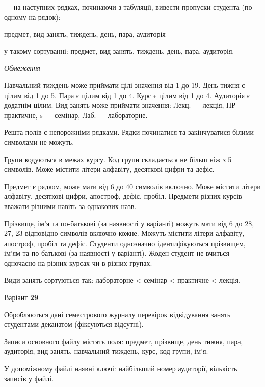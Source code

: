 \documentclass[11pt, ukrainian]{article}
\begin{document}
{\noindent}--- на наступних рядках, починаючи з табуляції, вивести пропуски студента (по одному на рядок):\par
предмет, вид занять, тиждень, день, пара, аудиторія

{\noindent}у такому сортуванні: предмет, вид занять, тиждень, день, пара, аудиторія.


\bigskip\textit{Обмеження}

Навчальний тиждень може приймати цілі значення від 1 до 19.
День тижня є цілим від 1 до 5. Пара є цілим від 1 до 4.
Курс є цілим від 1 до 4. Аудиторія є додатнім цілим.
Вид занять може приймати значення:
Лекц. --- лекція, ПР --- практичне, s --- семінар, Лаб. --- лабораторне.

Решта полів є непорожніми рядками.
Рядки починатися та закінчуватися білими символами не можуть.

Групи кодуються в межах курсу.
Код групи складається не більш ніж з 5 символів.
Може містити літери алфавіту, десяткові цифри та дефіс.

Предмет є рядком, може мати від 6 до 40 символів включно.
Може містити літери алфавіту, десяткові цифри, апостроф, дефіс, пробіл.
Предмети різних курсів вважати різними навіть за однакових назв.

Прізвище, ім’я та по-батькові (за наявності у варіанті)
можуть мати від 6 до 28, 27, 23 відповідно символів включно кожне.
Можуть містити літери алфавіту, апостроф, пробіл та дефіс.
Студенти однозначно ідентифікуються прізвищем, ім’ям та по-батькові (за наявності у варіанті).
Жоден студент не вчиться одночасно на різних курсах чи в різних групах.

Види занять сортуються так: лабораторне < семінар < практичне < лекція.



\par
\newpage
{\center Варіант  \No \textbf { 29 }\par}
\bigskip
Обробляються дані семестрового журналу перевірок відвідування занять студентами деканатом (фіксуються відсутні). 

\underline{Записи основного файлу містять поля}: предмет, прізвище, день тижня, пара, аудиторія, вид занять, навчальний тиждень, курс, код групи, ім’я.

\underline{У допоміжному файлі наявні ключі}: найбільший номер аудиторії, кількість записів у файлі.
\end{document}
